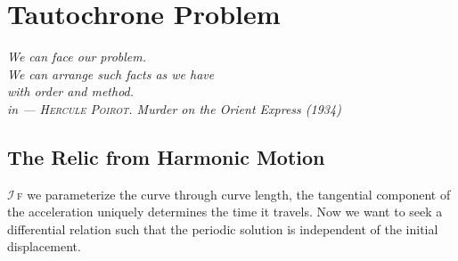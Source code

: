 \chapter{Tautochrone Problem}
\setcounter{section}{0}
{\flushright
	{\sffamily\slshape
		We can face our problem. \\
		We can arrange such facts as we have \\
		with order and method.\\
		 in
		{\sffamily\upshape --- \textsc{Hercule Poirot}.  \it Murder on the Orient Express \rm (1934)}
	}	
\vskip 2in 
}


\section{The Relic from Harmonic Motion\hfill}
\lettrine[lines=2]{$\mathcal{I}$\,}\lowercase{f} we parameterize the curve through curve length, the tangential component of 
the acceleration uniquely determines the time it travels. Now we want to 
seek a differential relation such that the periodic solution is independent
of the initial displacement. 

